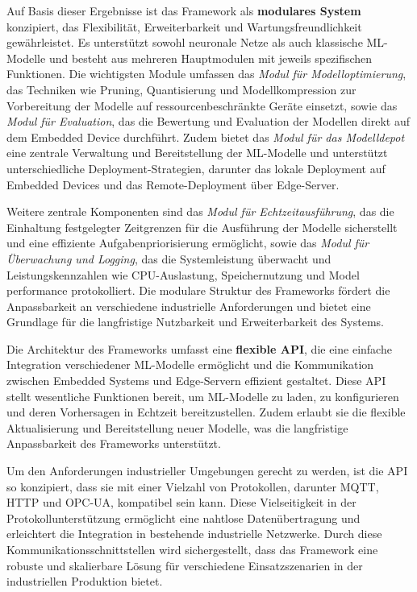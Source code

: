 Auf Basis dieser Ergebnisse ist das Framework als \textbf{modulares System} konzipiert, das Flexibilität, Erweiterbarkeit und Wartungsfreundlichkeit gewährleistet. 
Es unterstützt sowohl neuronale Netze als auch klassische ML-Modelle und besteht aus mehreren Hauptmodulen mit jeweils spezifischen Funktionen. Die wichtigsten Module 
umfassen das \textit{Modul für Modelloptimierung}, das Techniken wie Pruning, Quantisierung und Modellkompression zur Vorbereitung der Modelle auf ressourcenbeschränkte 
Geräte einsetzt, sowie das \textit{Modul für Evaluation}, das die Bewertung und Evaluation der Modellen direkt auf dem Embedded Device durchführt. 
Zudem bietet das \textit{Modul für das Modelldepot} eine zentrale Verwaltung und Bereitstellung der ML-Modelle und unterstützt unterschiedliche Deployment-Strategien, 
darunter das lokale Deployment auf Embedded Devices und das Remote-Deployment über Edge-Server.

Weitere zentrale Komponenten sind das \textit{Modul für Echtzeitausführung}, das die Einhaltung festgelegter Zeitgrenzen für die Ausführung der Modelle sicherstellt 
und eine effiziente Aufgabenpriorisierung ermöglicht, sowie das \textit{Modul für Überwachung und Logging}, das die Systemleistung überwacht und Leistungskennzahlen wie CPU-Auslastung, 
Speichernutzung und Model performance protokolliert. Die modulare Struktur des Frameworks fördert die Anpassbarkeit an verschiedene industrielle Anforderungen und bietet 
eine Grundlage für die langfristige Nutzbarkeit und Erweiterbarkeit des Systems.

Die Architektur des Frameworks umfasst eine \textbf{flexible API}, die eine einfache Integration verschiedener ML-Modelle ermöglicht und die Kommunikation zwischen Embedded Systems 
und Edge-Servern effizient gestaltet. Diese API stellt wesentliche Funktionen bereit, um ML-Modelle zu laden, zu konfigurieren und deren Vorhersagen in Echtzeit bereitzustellen. 
Zudem erlaubt sie die flexible Aktualisierung und Bereitstellung neuer Modelle, was die langfristige Anpassbarkeit des Frameworks unterstützt.

Um den Anforderungen industrieller Umgebungen gerecht zu werden, ist die API so konzipiert, dass sie mit einer Vielzahl von Protokollen, darunter MQTT, HTTP und OPC-UA, kompatibel sein kann. 
Diese Vielseitigkeit in der Protokollunterstützung ermöglicht eine nahtlose Datenübertragung und erleichtert die Integration in bestehende industrielle Netzwerke. 
Durch diese Kommunikationsschnittstellen wird sichergestellt, dass das Framework eine robuste und skalierbare Lösung für verschiedene Einsatzszenarien in der 
industriellen Produktion bietet.

